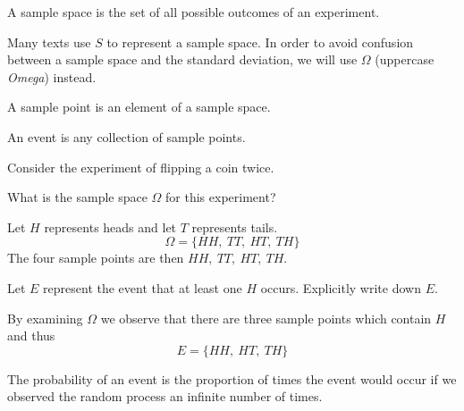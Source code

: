 \begin{definition}	
A sample space is the set of all possible outcomes of an experiment.
\end{definition}

\noindent
Many texts use $S$ to represent a sample space. In order to avoid confusion between a sample space and the standard deviation, we will use $\Omega$ (uppercase \textit{Omega}) instead.

\begin{definition}
A sample point is an element of a sample space.
\end{definition}

\begin{definition}[Event]
An event is any collection of sample points.
\end{definition}

\begin{example}
Consider the experiment of flipping a coin twice. 

\begin{benumerate}
\item	What is the sample space $\Omega$ for this experiment?
\item[] Let $H$ represents heads and let $T$ represents tails. 
	\[ \Omega = \lbrace HH,~TT,~HT,~TH \rbrace \]
	The four sample points are then $HH,~TT,~HT,~TH$. 
\item	Let $E$ represent the event that at least one $H$ occurs.
	Explicitly write down $E$.
\item[] By examining $\Omega$ we observe that there are three sample points which contain $H$ and thus
	\[ E = \lbrace HH,~HT,~TH \rbrace \]
\end{benumerate}

\end{example}

\begin{definition}[Probability]
The probability of an event is the proportion of times the event would occur if
we observed the random process an infinite number of times.
\end{definition}

